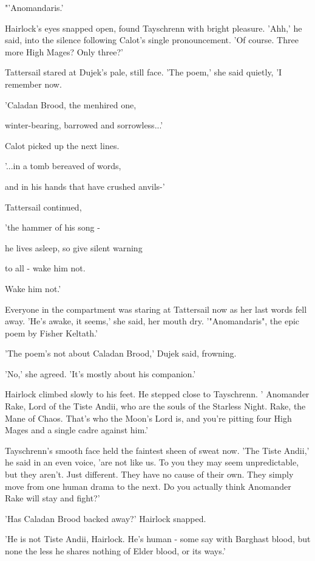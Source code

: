\begin{garbage}
{  "'Anomandaris.'
  
  Hairlock's eyes snapped open, found Tayschrenn with bright pleasure. 'Ahh,' he said, into the silence following Calot's single pronouncement. 'Of course. Three more High Mages? Only three?'
  
  Tattersail stared at Dujek's pale, still face. 'The poem,' she said quietly, 'I remember now.
  
  'Caladan Brood, the menhired one,
  
  winter-bearing, barrowed and sorrowless...'
  
  Calot picked up the next lines.
  
  '...in a tomb bereaved of words,
  
  and in his hands that have crushed anvils-'
  
  Tattersail continued, 
  
  'the hammer of his song - 
  
  he lives asleep, so give silent warning
  
  to all - wake him not.
  
  Wake him not.'
  
  Everyone in the compartment was staring at Tattersail now as her last words fell away. 'He's awake, it seems,' she said, her mouth dry. '"Anomandaris", the epic poem by Fisher Keltath.' 
  
  'The poem's not about Caladan Brood,' Dujek said, frowning. 
  
  'No,' she agreed. 'It's mostly about his companion.'
  
  Hairlock climbed slowly to his feet. He stepped close to Tayschrenn. ' Anomander Rake, Lord of the Tiste Andii, who are the souls of the Starless Night. Rake, the Mane of Chaos. That's who the Moon's Lord is, and you're pitting four High Mages and a single cadre against him.' 
  
  Tayschrenn's smooth face held the faintest sheen of sweat now. 'The Tiste Andii,' he said in an even voice, 'are not like us. To you they may seem unpredictable, but they aren't. Just different. They have no cause of their own. They simply move from one human drama to the next. Do you actually think Anomander Rake will stay and fight?'
  
  'Has Caladan Brood backed away?' Hairlock snapped.
  
  'He is not Tiste Andii, Hairlock. He's human - some say with Barghast blood, but none the less he shares nothing of Elder blood, or its ways.' 
  
}
\end{garbage}
